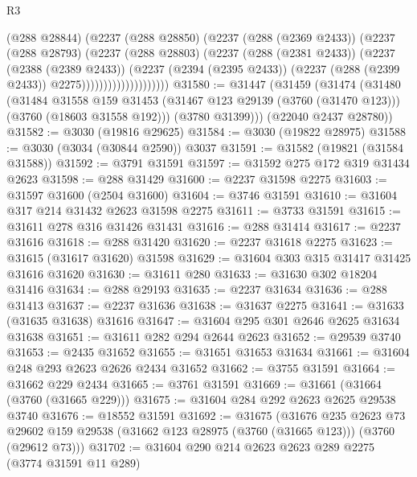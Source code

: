 \begin{lexlean}{R3}
\begin{coremodule}
                            (@288 @28844)
                            (@2237
                              (@288 @28850)
                              (@2237
                                (@288 (@2369 @2433))
                                (@2237
                                  (@288 @28793)
                                  (@2237
                                    (@288 @28803)
                                    (@2237
                                      (@288 (@2381 @2433))
                                      (@2237
                                        (@2388 (@2389 @2433))
                                        (@2237
                                          (@2394 (@2395 @2433))
                                          (@2237 (@288 (@2399 @2433)) @2275))))))))))))))))))))
@31580 := @31447
    (@31459
      (@31474
        (@31480
          (@31484
            @31558
            @159
            @31453
            (@31467 @123 @29139 (@3760 (@31470 @123)))
            (@3760 (@18603 @31558 @192)))
          (@3780 @31399)))
      (@22040 @2437 @28780))
@31582 := @3030 (@19816 @29625)
@31584 := @3030 (@19822 @28975)
@31588 := @3030 (@3034 (@30844 @2590)) @3037
@31591 := @31582 (@19821 (@31584 @31588))
@31592 := @3791 @31591
@31597 := @31592 @275 @172 @319 @31434 @2623
@31598 := @288 @31429
@31600 := @2237 @31598 @2275
@31603 := @31597 @31600 (@2504 @31600)
@31604 := @3746 @31591
@31610 := @31604 @317 @214 @31432 @2623 @31598 @2275
@31611 := @3733 @31591
@31615 := @31611 @278 @316 @31426 @31431
@31616 := @288 @31414
@31617 := @2237 @31616
@31618 := @288 @31420
@31620 := @2237 @31618 @2275
@31623 := @31615 (@31617 @31620) @31598
@31629 := @31604 @303 @315 @31417 @31425 @31616 @31620
@31630 := @31611 @280
@31633 := @31630 @302 @18204 @31416
@31634 := @288 @29193
@31635 := @2237 @31634
@31636 := @288 @31413
@31637 := @2237 @31636
@31638 := @31637 @2275
@31641 := @31633 (@31635 @31638) @31616
@31647 := @31604 @295 @301 @2646 @2625 @31634 @31638
@31651 := @31611 @282 @294 @2644 @2623
@31652 := @29539 @3740
@31653 := @2435 @31652
@31655 := @31651 @31653 @31634
@31661 := @31604 @248 @293 @2623 @2626 @2434 @31652
@31662 := @3755 @31591
@31664 := @31662 @229 @2434
@31665 := @3761 @31591
@31669 := @31661 (@31664 (@3760 (@31665 @229)))
@31675 := @31604 @284 @292 @2623 @2625 @29538 @3740
@31676 := @18552 @31591
@31692 := @31675
    (@31676
      @235
      @2623
      @73
      @29602
      @159
      @29538
      (@31662 @123 @28975 (@3760 (@31665 @123)))
      (@3760 (@29612 @73)))
@31702 := @31604 @290 @214 @2623 @2623 @289 @2275 (@3774 @31591 @11 @289)

\end{coremodule}
\end{lexlean}

